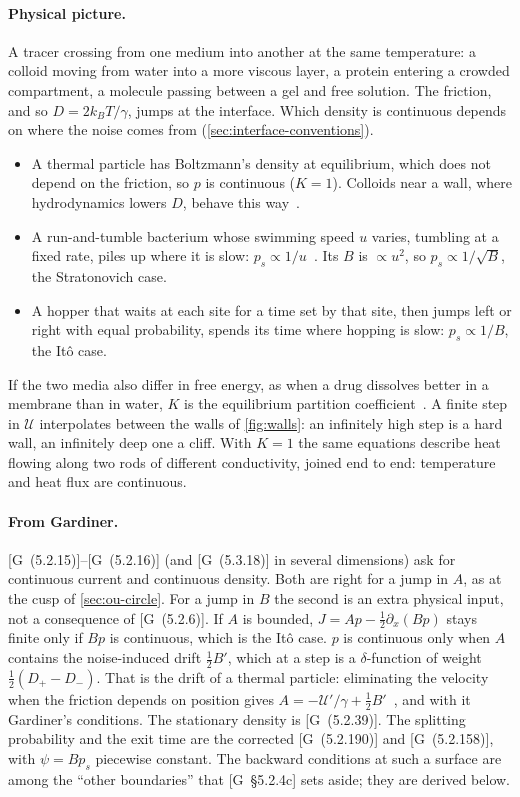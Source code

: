 \documentclass[11pt]{article}
\numberwithin{equation}{section}
\newcommand{\G}[1]{[G~(#1)]}
\newcommand{\Gs}[1]{[G~\S#1]}
\begin{document}
\paragraph{Physical picture.} A tracer crossing from one medium into another at the same temperature: a colloid
moving from water into a more viscous layer, a protein entering a crowded compartment, a molecule passing between a
gel and free solution. The friction, and so $D=2k_BT/\gamma$, jumps at the interface. Which density is continuous
depends on where the noise comes from (\cref{sec:interface-conventions}).
\begin{itemize}
  \item A thermal particle has Boltzmann's density at equilibrium, which does not depend on the friction, so $p$ is
        continuous ($K=1$). Colloids near a wall, where hydrodynamics lowers $D$, behave this way~\cite{volpe}.
  \item A run-and-tumble bacterium whose swimming speed $u$ varies, tumbling at a fixed rate, piles up where it is
        slow: $p_s\propto1/u$~\cite{tailleur}. Its $B$ is $\propto u^2$, so $p_s\propto1/\sqrt B$, the Stratonovich
        case.
  \item A hopper that waits at each site for a time set by that site, then jumps left or right with equal
        probability, spends its time where hopping is slow: $p_s\propto1/B$, the It\^o case.
\end{itemize}
If the two media also differ in free energy, as when a drug dissolves better in a membrane than in water, $K$ is the
equilibrium partition coefficient~\cite{crank}. A finite step in $\mathcal U$ interpolates between the walls of
\cref{fig:walls}: an infinitely high step is a hard wall, an infinitely deep one a cliff. With $K=1$ the same
equations describe heat flowing along two rods of different conductivity, joined end to end: temperature and heat
flux are continuous.

\paragraph{From Gardiner.} \G{5.2.15}--\G{5.2.16} (and \G{5.3.18} in several dimensions) ask for continuous current
and continuous density. Both are right for a jump in $A$, as at the cusp of \cref{sec:ou-circle}. For a jump in $B$
the second is an extra physical input, not a consequence of \G{5.2.6}. If $A$ is bounded, $J=Ap-\frac12\partial_x(Bp)$
stays finite only if $Bp$ is continuous, which is the It\^o case. $p$ is continuous only when $A$ contains the
noise-induced drift $\frac12B'$, which at a step is a $\delta$-function of weight $\frac12(D_+-D_-)$. That is the
drift of a thermal particle: eliminating the velocity when the friction depends on position gives
$A=-\mathcal U'/\gamma+\frac12B'$~\cite{sancho}, and with it Gardiner's conditions. The stationary density is
\G{5.2.39}. The splitting probability and the exit time are the corrected \G{5.2.190} and \G{5.2.158}, with
$\psi=Bp_s$ piecewise constant. The backward conditions at such a surface are among the ``other boundaries'' that
\Gs{5.2.4c} sets aside; they are derived below.
\end{document}
